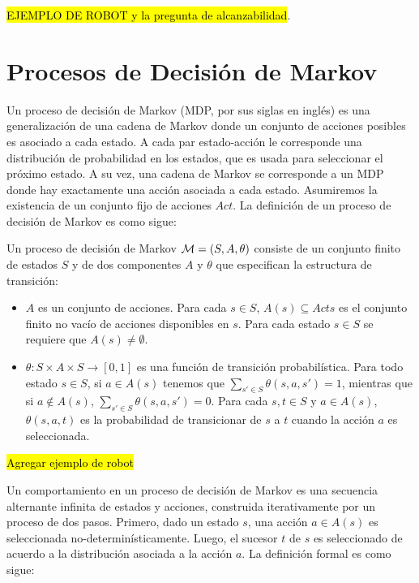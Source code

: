 \hl{EJEMPLO DE ROBOT y la pregunta de alcanzabilidad}.

\section{Procesos de Decisión de Markov}

Un proceso de decisión de Markov (MDP, por sus siglas en inglés) es una
generalización de una cadena de Markov donde un conjunto de acciones posibles
es asociado a cada estado. A cada par estado-acción le corresponde una
distribución de probabilidad en los estados, que es usada para seleccionar el
próximo estado. A su vez, una cadena de Markov se corresponde a un MDP donde
hay exactamente una acción asociada a cada estado. Asumiremos la existencia de
un conjunto fijo de acciones $Act$. La definición de un proceso de decisión de
Markov es como sigue:

\begin{definition}
	Un proceso de decisión de Markov $\mathcal{M} =(S, A, \theta)$ consiste de un conjunto finito de estados $S$ y de dos componentes $A$ y $\theta$ que especifican la estructura de transición:
	\begin{itemize}
		\item $A$ es un conjunto de acciones. Para cada $s \in S$, $A(s) \subseteq Acts$ es el conjunto finito no vacío de
		      acciones disponibles en $s$. Para cada estado $s \in S$ se requiere que $A(s) \neq \emptyset$.
		\item $\theta : S \times A \times S \rightarrow [0,1]$ es una función de transición probabilística. Para todo estado $s \in S$, si $a \in A(s)$ tenemos que $\sum_{s' \in S} \theta(s, a, s') = 1$, mientras que si $a \notin A(s)$, $\sum_{s' \in S} \theta(s, a, s') = 0$. Para cada $s, t \in S$ y $a \in A(s)$, $\theta(s, a, t)$ es la probabilidad de transicionar de $s$ a $t$ cuando la acción $a$ es seleccionada.
	\end{itemize}
\end{definition}

\hl{Agregar ejemplo de robot}

Un comportamiento en un proceso de decisión de Markov es una secuencia
alternante infinita de estados y acciones, construida iterativamente por un
proceso de dos pasos. Primero, dado un estado $s$, una acción $a \in A(s)$ es
seleccionada no-determinísticamente. Luego, el sucesor $t$ de $s$ es
seleccionado de acuerdo a la distribución asociada a la acción $a$. La
definición formal es como sigue:

